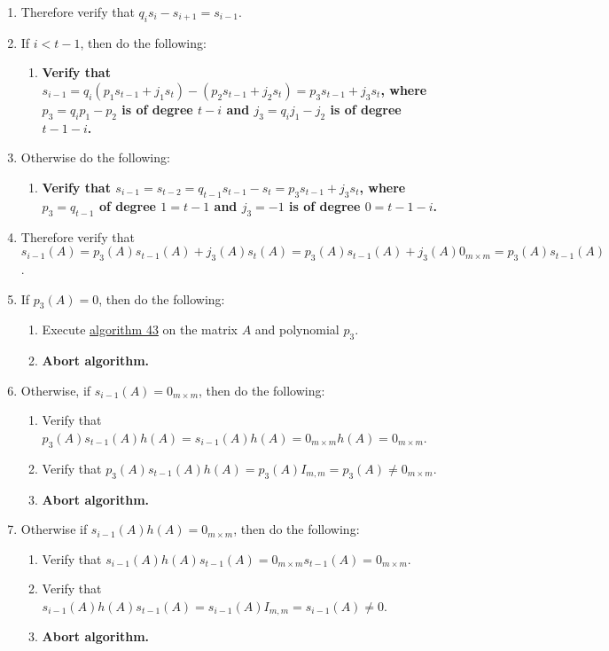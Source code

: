 \documentclass[twocolumn]{article}
\begin{document}
\begin{enumerate}
\begin{enumerate}
					\item Therefore verify that $q_is_i-s_{i+1}=s_{i-1}$.
					\item If $i<t-1$, then do the following:
					\begin{enumerate}
						\item \textbf{Verify that $s_{i-1}=q_i(p_1s_{t-1}+j_1s_t)-(p_2s_{t-1}+j_2s_t)=p_3s_{t-1}+j_3s_t$, where $p_3=q_ip_1-p_2$ is of degree $t-i$ and $j_3=q_ij_1-j_2$ is of degree $t-1-i$.}
					\end{enumerate}
					\item Otherwise do the following:
					\begin{enumerate}
						\item \textbf{Verify that $s_{i-1}=s_{t-2}=q_{t-1}s_{t-1}-s_t=p_3s_{t-1}+j_3s_t$, where $p_3=q_{t-1}$ of degree $1=t-1$ and $j_3=-1$ is of degree $0=t-1-i$.}
					\end{enumerate}
					\item Therefore verify that $s_{i-1}(A)=p_3(A)s_{t-1}(A)+j_3(A)s_t(A)=p_3(A)s_{t-1}(A)+j_3(A)0_{m\times m}=p_3(A)s_{t-1}(A)$.
					\item If $p_3(A)=0$, then do the following:
					\begin{enumerate}
						\item Execute \hyperref[sec:algorithm 43]{algorithm 43} on the matrix $A$ and polynomial $p_3$.
						\item \textbf{Abort algorithm.}
					\end{enumerate}
					\item Otherwise, if $s_{i-1}(A)=0_{m\times m}$, then do the following:
					\begin{enumerate}
						\item Verify that $p_3(A)s_{t-1}(A)h(A)=s_{i-1}(A)h(A)=0_{m\times m}h(A)=0_{m\times m}$.
						\item Verify that $p_3(A)s_{t-1}(A)h(A)=p_3(A)I_{m,m}=p_3(A)\ne0_{m\times m}$.
						\item \textbf{Abort algorithm.}
					\end{enumerate}
					\item Otherwise if $s_{i-1}(A)h(A)=0_{m\times m}$, then do the following:
					\begin{enumerate}
						\item Verify that $s_{i-1}(A)h(A)s_{t-1}(A)=0_{m\times m}s_{t-1}(A)=0_{m\times m}$.
						\item Verify that $s_{i-1}(A)h(A)s_{t-1}(A)=s_{i-1}(A)I_{m,m}=s_{i-1}(A)\ne 0$.
						\item \textbf{Abort algorithm.}

\end{enumerate}
\end{enumerate}
\end{enumerate}
\end{document}
